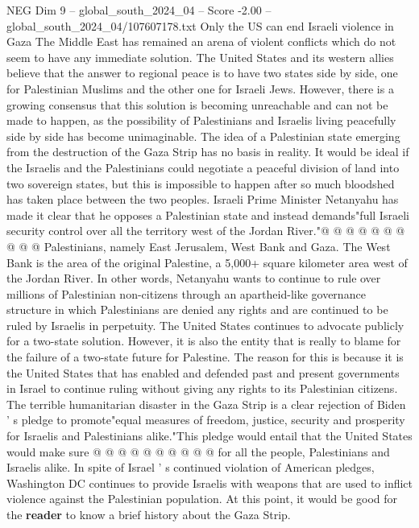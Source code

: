 \begin{textsample}{NEG Dim 9 – global\_south\_2024\_04 – Score -2.00 – global\_south\_2024\_04/107607178.txt}  \label{ex:f9_neg_379}
Only the US can end Israeli violence in Gaza The Middle East has remained an arena of violent conflicts which do not seem to have any immediate solution.
The United States and its western allies believe that the answer to regional peace is to have two states side by side, one for Palestinian Muslims and the other one for Israeli Jews.
However, there is a growing consensus that this solution is becoming unreachable and can not be made to happen, as the possibility of Palestinians and Israelis living peacefully side by side has become unimaginable.
The idea of a Palestinian state emerging from the destruction of the Gaza Strip has no basis in reality.
It would be ideal if the Israelis and the Palestinians could negotiate a peaceful division of land into two sovereign states, but this is impossible to happen after so much bloodshed has taken place between the two peoples.
Israeli Prime Minister Netanyahu has made it clear that he opposes a Palestinian state and instead demands"full Israeli security control over all the territory west of the Jordan River."@ @ @ @ @ @ @ @ @ @ Palestinians, namely East Jerusalem, West Bank and Gaza.
The West Bank is the area of the original Palestine, a 5,000+ square kilometer area west of the Jordan River.
In other words, Netanyahu wants to continue to rule over millions of Palestinian non-citizens through an apartheid-like governance structure in which Palestinians are denied any rights and are continued to be ruled by Israelis in perpetuity.
The United States continues to advocate publicly for a two-state solution.
However, it is also the entity that is really to blame for the failure of a two-state future for Palestine.
The reason for this is because it is the United States that has enabled and defended past and present governments in Israel to continue ruling without giving any rights to its Palestinian citizens.
The terrible humanitarian disaster in the Gaza Strip is a clear rejection of Biden ' s pledge to promote"equal measures of freedom, justice, security and prosperity for Israelis and Palestinians alike."This pledge would entail that the United States would make sure @ @ @ @ @ @ @ @ @ @ for all the people, Palestinians and Israelis alike.
In spite of Israel ' s continued violation of American pledges, Washington DC continues to provide Israelis with weapons that are used to inflict violence against the Palestinian population.
At this point, it would be good for the \textbf{reader} to know a brief history about the Gaza Strip.

\end{textsample}
